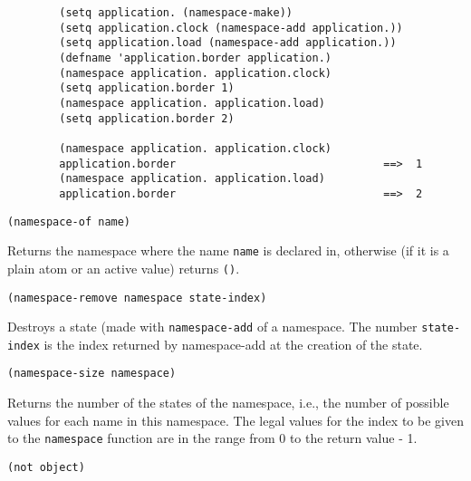 {\exemplefont\begin{verbatim}
        (setq application. (namespace-make))
        (setq application.clock (namespace-add application.))
        (setq application.load (namespace-add application.))
        (defname 'application.border application.)
        (namespace application. application.clock)
        (setq application.border 1)
        (namespace application. application.load)
        (setq application.border 2)

        (namespace application. application.clock)
        application.border                                ==>  1
        (namespace application. application.load)
        application.border                                ==>  2
\end{verbatim}}


{\usagefont\begin{verbatim}
(namespace-of name)
\end{verbatim}}\usageupspace

Returns the namespace where the name \verb"name" is declared in, otherwise
(if it is a plain atom or an active value) returns \verb"()".


{\usagefont\begin{verbatim}
(namespace-remove namespace state-index)
\end{verbatim}}\usageupspace

Destroys a state (made with \verb"namespace-add" of a namespace. The number
\verb"state-index" is the index returned by namespace-add at the creation of
the state.


{\usagefont\begin{verbatim}
(namespace-size namespace)
\end{verbatim}}\usageupspace

Returns the number of the states of the namespace, i.e., the number of
possible values for each name in this namespace. The legal values for the
index to be given to the \verb"namespace" function are in the range
from 0 to the return value - 1.

        
{\usagefont\begin{verbatim}
(not object)
\end{verbatim}}\usageupspace

